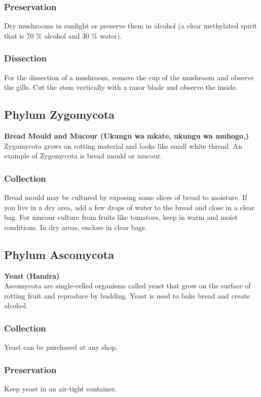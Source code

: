 \subsubsection*{Preservation} 
Dry mushrooms in sunlight or preserve them in alcohol (a clear methylated spirit that is 70 \% alcohol and 30 \% water).

\subsubsection*{Dissection}
For the dissection of a mushroom, remove the cup of the mushroom and observe the gills. Cut the stem vertically with a razor blade and observe the inside.

\subsection{Phylum Zygomycota}

\textbf{Bread Mould and Mucour (Ukungu wa mkate, ukungu wa muhogo,)}\\
Zygomycota grows on rotting material and looks like small white thread. An example of Zygomycota is bread mould or mucour.

\subsubsection{Collection}

Bread mould may be cultured by exposing some slices of bread to moisture. If you live in a dry area, add a few drops of water to the bread and close in a clear bag.
For mucour culture from fruits like tomatoes, keep in warm and moist conditions. In dry areas, enclose in clear bags. 

\subsection{Phylum Ascomycota}

\textbf{Yeast (Hamira)}\\
Ascomycota are single-celled organisms called yeast that grow on the surface of rotting fruit and reproduce by budding. Yeast is used to bake bread and create alcohol.

\subsubsection{Collection}
Yeast can be purchased at any shop.

\subsubsection*{Preservation} 
Keep yeast in an air-tight container.

